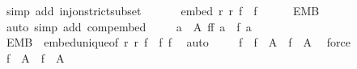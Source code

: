 \begin{isabellebody}
\ {\isacharparenleft}{\kern0pt}simp\ add{\isacharcolon}{\kern0pt}\ inj{\isacharunderscore}{\kern0pt}on{\isacharunderscore}{\kern0pt}strict{\isacharunderscore}{\kern0pt}subset{\isacharparenright}{\kern0pt}\isanewline
\ \ \isamarkupfalse%
\isanewline
\ \ \isacommand{{\isacharbraceleft}{\kern0pt}}\isamarkupfalse%
\isamarkupfalse%
\ {\isachardoublequoteopen}embed\ r{}\ r{}\ {\isacharparenleft}{\kern0pt}f{}{}\ {\isasymcirc}\ f{}{}{\isacharparenright}{\kern0pt}{\isachardoublequoteclose}\isanewline
\ \ \ \isamarkupfalse%
\ {}\ EMB{}{}\ {}\ \isamarkupfalse%
\ {\isacharparenleft}{\kern0pt}auto\ simp\ add{\isacharcolon}{\kern0pt}\ comp{\isacharunderscore}{\kern0pt}embed{\isacharparenright}{\kern0pt}\isanewline
\ \ \ \isamarkupfalse%
\ {\isachardoublequoteopen}{\isasymforall}a\ {\isasymin}\ {\isacharquery}{\kern0pt}A{}{\isachardot}{\kern0pt}\ f{}{}{\isacharparenleft}{\kern0pt}f{}{}\ a{\isacharparenright}{\kern0pt}\ {\isacharequal}{\kern0pt}\ f{}{}\ a{\isachardoublequoteclose}\isanewline
\ \ \ \isamarkupfalse%
\ EMB{}{}\ {}\ embed{\isacharunderscore}{\kern0pt}unique{\isacharbrackleft}{\kern0pt}of\ r{}\ r{}\ {\isachardoublequoteopen}f{}{}\ {\isasymcirc}\ f{}{}{\isachardoublequoteclose}\ f{}{}{\isacharbrackright}{\kern0pt}\ \isamarkupfalse%
\ auto\isanewline
\ \ \ \isamarkupfalse%
\ {\isachardoublequoteopen}f{}{}\ {\isacharbackquote}{\kern0pt}\ {\isacharparenleft}{\kern0pt}f{}{}\ {\isacharbackquote}{\kern0pt}\ {\isacharquery}{\kern0pt}A{}{\isacharparenright}{\kern0pt}\ {\isacharequal}{\kern0pt}\ f{}{}\ {\isacharbackquote}{\kern0pt}\ {\isacharquery}{\kern0pt}A{}{\isachardoublequoteclose}\ \isamarkupfalse%
\ force\isanewline
\ \ \isacommand{{\isacharbraceright}{\kern0pt}}\isamarkupfalse%
\isanewline
\ \ \isamarkupfalse%
\isanewline
\ \ \isamarkupfalse%
\ {\isachardoublequoteopen}f{}{}\ {\isacharbackquote}{\kern0pt}\ {\isacharquery}{\kern0pt}A{}\ {\isacharless}{\kern0pt}\ f{}{}\ {\isacharbackquote}{\kern0pt}\ {\isacharquery}{\kern0pt}A{}{\isachardoublequoteclose}\ \isamarkupfalse%

\end{isabellebody}
